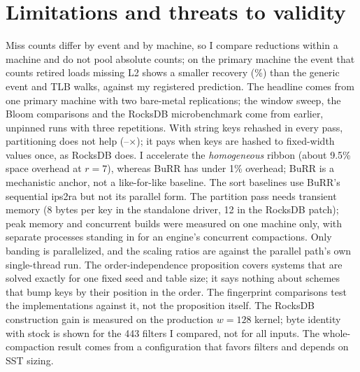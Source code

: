 \documentclass{article}
\begin{document}
\section{Limitations and threats to validity}\label{sec:limits}
Miss counts differ by event and by machine, so I compare reductions within a machine and do not pool absolute counts; on the primary machine the event that counts retired loads missing L2 shows a smaller recovery (\esevenrecltwocent\%) than the generic event and TLB walks, against my registered prediction. The headline comes from one primary machine with two bare-metal replications; the window sweep, the Bloom comparisons and the RocksDB microbenchmark come from earlier, unpinned runs with three repetitions. With string keys rehashed in every pass, partitioning does not help (\esevendirectssixtyfour--\esevendirectssixteen$\times$); it pays when keys are hashed to fixed-width values once, as RocksDB does. I accelerate the \emph{homogeneous} ribbon (about 9.5\% space overhead at $r=7$), whereas BuRR has under 1\% overhead; BuRR is a mechanistic anchor, not a like-for-like baseline. The sort baselines use BuRR's sequential ips2ra but not its parallel form. The partition pass needs transient memory (8 bytes per key in the standalone driver, 12 in the RocksDB patch); peak memory and concurrent builds were measured on one machine only, with separate processes standing in for an engine's concurrent compactions. Only banding is parallelized, and the scaling ratios are against the parallel path's own single-thread run. The order-independence proposition covers systems that are solved exactly for one fixed seed and table size; it says nothing about schemes that bump keys by their position in the order. The fingerprint comparisons test the implementations against it, not the proposition itself. The RocksDB construction gain is measured on the production $w=128$ kernel; byte identity with stock is shown for the 443 filters I compared, not for all inputs. The whole-compaction result comes from a configuration that favors filters and depends on SST sizing.
\end{document}

